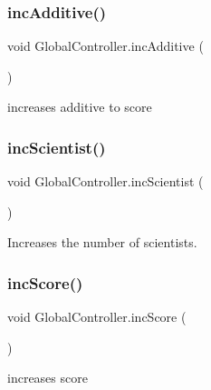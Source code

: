 \mbox{\label{class_global_controller_afe1a424022cd73ea41fd2385db6a6189}} 
\subsubsection{\texorpdfstring{inc\+Additive()}{incAdditive()}}
{\footnotesize\ttfamily void Global\+Controller.\+inc\+Additive (\begin{DoxyParamCaption}{ }\end{DoxyParamCaption})}



increases additive to score 

\mbox{\label{class_global_controller_a84e2d66e0c6c9baa79963554f6f3b2bd}} 
\subsubsection{\texorpdfstring{inc\+Scientist()}{incScientist()}}
{\footnotesize\ttfamily void Global\+Controller.\+inc\+Scientist (\begin{DoxyParamCaption}{ }\end{DoxyParamCaption})}



Increases the number of scientists. 

\mbox{\label{class_global_controller_afe90e502d26e3585ef975555464bc323}} 
\subsubsection{\texorpdfstring{inc\+Score()}{incScore()}}
{\footnotesize\ttfamily void Global\+Controller.\+inc\+Score (\begin{DoxyParamCaption}{ }\end{DoxyParamCaption})}



increases score 

